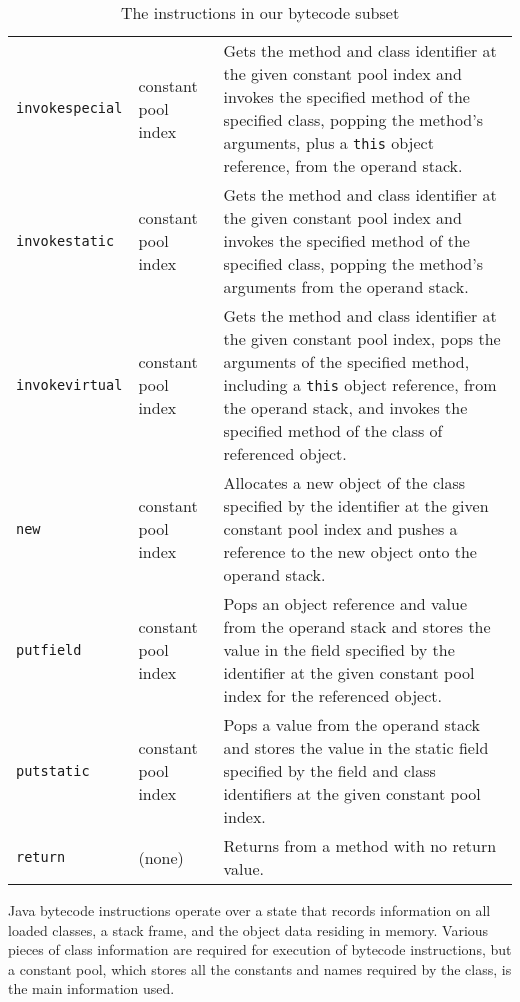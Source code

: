 \begin{table}
\begin{tabular}{llp{8.5cm}}
    \\
    \texttt{invokespecial} & constant pool index &
    Gets the method and class identifier at the given constant pool
    index and invokes the specified method of the specified class,
    popping the method's arguments, plus a \texttt{this} object
    reference, from the operand stack.
    \\
    \texttt{invokestatic} & constant pool index &
    Gets the method and class identifier at the given constant pool
    index and invokes the specified method of the specified class,
    popping the method's arguments from the operand stack.
    \\
    \texttt{invokevirtual} & constant pool index &
    Gets the method and class identifier at the given constant pool
    index, pops the arguments of the specified method, including a
    \texttt{this} object reference, from the operand stack, and
    invokes the specified method of the class of referenced object.
    \\
    \texttt{new} & constant pool index &
    Allocates a new object of the class specified by the identifier at
    the given constant pool index and pushes a reference to the new
    object onto the operand stack.
    \\
    \texttt{putfield} & constant pool index &
    Pops an object reference and value from the operand stack and
    stores the value in the field specified by the identifier at the
    given constant pool index for the referenced object.
    \\
    \texttt{putstatic} & constant pool index &
    Pops a value from the operand stack and stores the value in the
    static field specified by the field and class identifiers at the
    given constant pool index.
    \\
    \texttt{return} & (none) &
    Returns from a method with no return value.
    \\
    \hline
  \end{tabular}
  \caption{The instructions in our bytecode subset}
  \label{bytecode-subset-table}
\end{table}

Java bytecode instructions operate over a state that records
information on all loaded classes, a stack frame, and the object data
residing in memory.
Various pieces of class information are required for execution of
bytecode instructions, but a constant pool, which stores all the
constants and names required by the class, is the main information
used.

